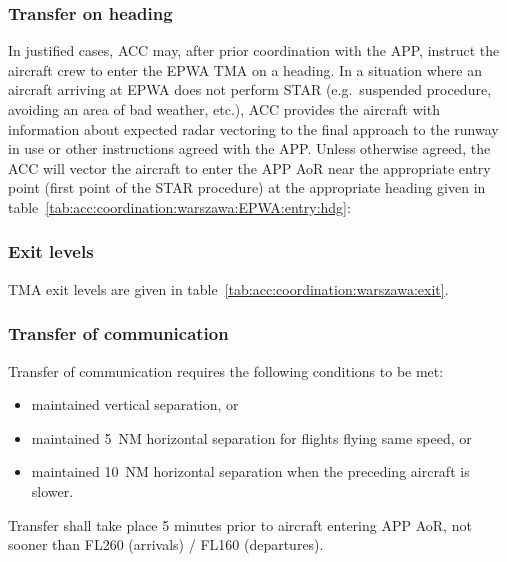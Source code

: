 \subsubsection{Transfer on heading}

In justified cases, ACC may, after prior coordination with the APP, instruct the aircraft crew to enter the EPWA TMA on a heading.
In a situation where an aircraft arriving at EPWA does not perform STAR (e.g.\ suspended procedure, avoiding an area of bad weather, etc.), ACC provides the aircraft with information about expected radar vectoring to the final approach to the runway in use or other instructions agreed with the APP.\@
Unless otherwise agreed, the ACC will vector the aircraft to enter the APP AoR near the appropriate entry point (first point of the STAR procedure) at the appropriate heading given in table~\ref{tab:acc:coordination:warszawa:EPWA:entry:hdg}:
\begin{table}[htbp]
	
	\caption{TMA Warszawa --- arrivals entry via heading}
	\label{tab:acc:coordination:warszawa:EPWA:entry:hdg}
\end{table}

\subsubsection{Exit levels}
TMA exit levels are given in table~\ref{tab:acc:coordination:warszawa:exit}.
\begin{table}[htbp]
	
	\caption{TMA Warszawa --- exit levels}
	\label{tab:acc:coordination:warszawa:exit}
\end{table}

\subsubsection{Transfer of communication}

Transfer of communication requires the following conditions to be met:
\begin{itemize}
	\item maintained vertical separation, or
	\item maintained 5~NM horizontal separation for flights flying same speed, or
	\item maintained 10~NM horizontal separation when the preceding aircraft is slower.
\end{itemize}

Transfer shall take place 5 minutes prior to aircraft entering APP AoR, not sooner than FL260 (arrivals) / FL160 (departures).

